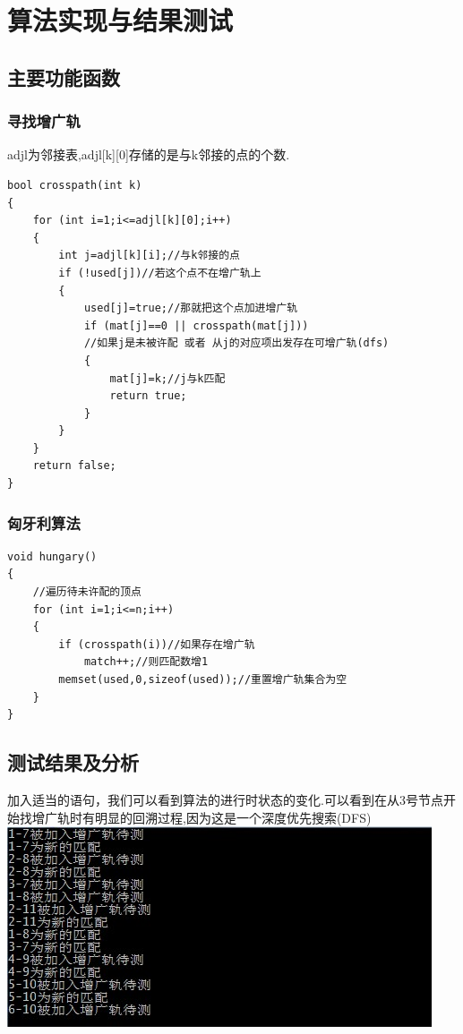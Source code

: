\documentclass[a4paper,cs4size,oneside,fancyhdr]{ctexrep}
\theoremstyle{nonumberplain}%
\theoremstyle{nonumberplain}%
\begin{document}
{{\chapter{算法实现与结果测试}

\section{主要功能函数}
\subsection{寻找增广轨}
adjl为邻接表,adjl[k][0]存储的是与k邻接的点的个数.
\begin{verbatim}
bool crosspath(int k)
{
    for (int i=1;i<=adjl[k][0];i++)
    {
        int j=adjl[k][i];//与k邻接的点
        if (!used[j])//若这个点不在增广轨上
        {
            used[j]=true;//那就把这个点加进增广轨
            if (mat[j]==0 || crosspath(mat[j]))
            //如果j是未被许配 或者 从j的对应项出发存在可增广轨(dfs)
            {
                mat[j]=k;//j与k匹配
                return true;
            }
        }
    }
    return false;
}
\end{verbatim}
\subsection{匈牙利算法}
\begin{verbatim}
void hungary()
{
    //遍历待未许配的顶点
    for (int i=1;i<=n;i++)
    {
        if (crosspath(i))//如果存在增广轨
            match++;//则匹配数增1
        memset(used,0,sizeof(used));//重置增广轨集合为空
    }
}
\end{verbatim}





\section{测试结果及分析}
加入适当的语句，我们可以看到算法的进行时状态的变化.可以看到在从3号节点开始找增广轨时有明显的回溯过程,因为这是一个深度优先搜索(DFS)
\centering
\includegraphics[scale=1]{p9.jpg}






}}
\end{document}
